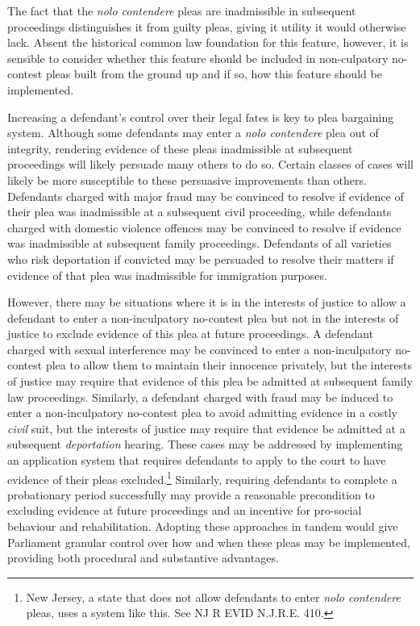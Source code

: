 The fact that the \textit{nolo contendere} pleas are inadmissible in subsequent proceedings distinguishes it from guilty pleas, giving it utility it would otherwise lack. Absent the historical common law foundation for this feature, however, it is sensible to consider whether this feature should be included in non-culpatory no-contest pleas built from the ground up and if so, how this feature should be implemented. 

Increasing a defendant's control over their legal fates is key to plea bargaining system. Although some defendants may enter a \textit{nolo contendere} plea out of integrity, rendering evidence of these pleas inadmissible at subsequent proceedings will likely persuade many others to do so. Certain classes of cases will likely be more susceptible to these persuasive improvements than others. Defendants charged with major fraud may be convinced to resolve if evidence of their plea was inadmissible at a subsequent civil proceeding, while defendants charged with domestic violence offences may be convinced to resolve if evidence was inadmissible at subsequent family proceedings. Defendants of all varieties who risk deportation if convicted may be persuaded to resolve their matters if evidence of that plea was inadmissible for immigration purposes.

However, there may be situations where it is in the interests of justice to allow a defendant to enter a non-inculpatory no-contest plea but not in the interests of justice to exclude evidence of this plea at future proceedings. A defendant charged with sexual interference may be convinced to enter a non-inculpatory no-contest plea to allow them to maintain their innocence privately, but the interests of justice may require that evidence of this plea be admitted at subsequent family law proceedings. Similarly, a defendant charged with fraud may be induced to enter a non-inculpatory no-contest plea to avoid admitting evidence in a costly \textit{civil} suit, but the interests of justice may require that evidence be admitted at a subsequent \textit{deportation} hearing. These cases may be addressed by implementing an application system that requires defendants to apply to the court to have evidence of their pleas excluded.\footnote{New Jersey, a state that does not allow defendants to enter \textit{nolo contendere} pleas, uses a system like this. See NJ R EVID N.J.R.E. 410.} Similarly, requiring defendants to complete a probationary period successfully may provide a reasonable precondition to excluding evidence at future proceedings and an incentive for pro-social behaviour and rehabilitation. Adopting these approaches in tandem would give Parliament granular control over how and when these pleas may be implemented, providing both procedural and substantive advantages.